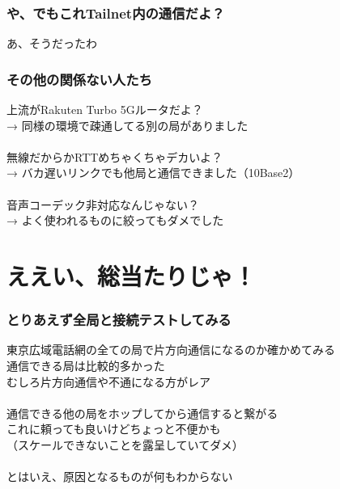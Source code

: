 \documentclass[
  lualatex,
  aspectratio=169,
  14pt
]{beamer}
\begin{document}
\begin{frame}
  \frametitle{や、でもこれTailnet内の通信だよ？}

  あ、そうだったわ

  \note{ }
\end{frame}

\begin{frame}
  \frametitle{その他の関係ない人たち}

  上流がRakuten Turbo 5Gルータだよ？\\
  \hspace{1.5\zw}→ 同様の環境で疎通してる別の局がありました
  \\~\\[-.5\baselineskip]

  無線だからかRTTめちゃくちゃデカいよ？\\
  \hspace{1.5\zw}→ バカ遅いリンクでも他局と通信できました（10Base2）
  \\~\\[-.5\baselineskip]

  音声コーデック非対応なんじゃない？\\
  \hspace{1.5\zw}→ よく使われるものに絞ってもダメでした

  \note{ }
\end{frame}

\section{ええい、総当たりじゃ！}
\note{ }

\begin{frame}
  \frametitle{とりあえず全局と接続テストしてみる}

  東京広域電話網の全ての局で片方向通信になるのか確かめてみる\\
  \hspace{1.5\zw}通信できる局は比較的多かった\\
  \hspace{1.5\zw}むしろ片方向通信や不通になる方がレア
  \\~\\[-.5\baselineskip]

  通信できる他の局をホップしてから通信すると繋がる\\
  \hspace{1.5\zw}これに頼っても良いけどちょっと不便かも\\
  \hspace{1.5\zw}（スケールできないことを露呈していてダメ）
  \\~\\[-.5\baselineskip]

  とはいえ、原因となるものが何もわからない

  \note{ }
\end{frame}
\end{document}
